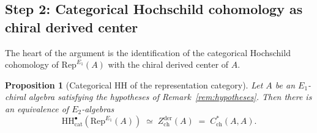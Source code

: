 \documentclass[11pt]{article}
\newtheorem{proposition}[theorem]{Proposition}
\theoremstyle{definition}
\theoremstyle{remark}
\newcommand{\Rep}{\mathrm{Rep}}
\newcommand{\HH}{\mathrm{HH}}
\newcommand{\Zder}{Z^{\mathrm{der}}_{\mathrm{ch}}}
\begin{document}
\subsection{Step 2: Categorical Hochschild cohomology as chiral derived center}

The heart of the argument is the identification of the categorical Hochschild cohomology of $\Rep^{E_1}(A)$ with the chiral derived center of $A$.

\begin{proposition}[Categorical HH of the representation category]
\label{prop:hh-rep-chiral}
Let $A$ be an $E_1$-chiral algebra satisfying the hypotheses of Remark~\ref{rem:hypotheses}. Then there is an equivalence of $E_2$-algebras
\begin{equation}
\label{eq:hh-zder}
 \HH^\bullet_{\mathrm{cat}}(\Rep^{E_1}(A)) \;\simeq\; \Zder(A) \;=\; C^*_{\mathrm{ch}}(A, A).
\end{equation}
\end{proposition}
\end{document}

